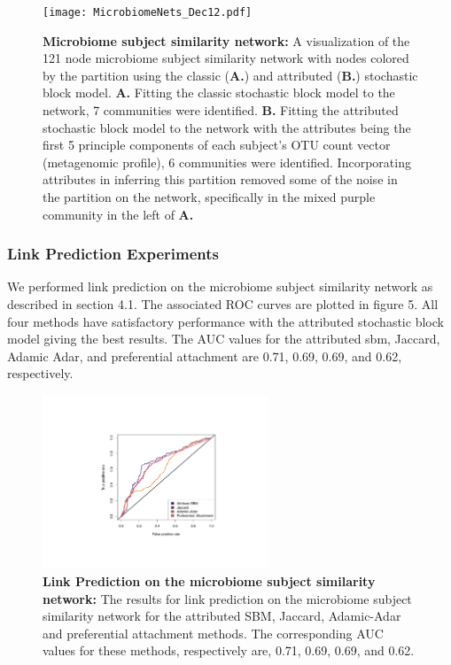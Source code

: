 \begin{figure}[h!]
\begin{center}
\texttt{[image: MicrobiomeNets\_Dec12.pdf]}
\caption{{\bf Microbiome subject similarity network:} A visualization of the 121 node microbiome subject similarity network with nodes colored by the partition using the classic ({\bf A.}) and attributed ({\bf B.}) stochastic block model. {\bf A.} Fitting the classic stochastic block model to the network, 7 communities were identified. {\bf B.} Fitting the attributed stochastic block model to the network with the attributes being the first 5 principle components of each subject's OTU count vector (metagenomic profile), 6 communities were identified. Incorporating attributes in inferring this partition removed some of the noise in the partition on the network, specifically in the mixed purple community in the left of {\bf A.}}
\end{center}
\end{figure}

\subsubsection{Link Prediction Experiments}
We performed link prediction on the microbiome subject similarity network as described in section 4.1. The associated ROC curves are plotted in figure 5. All four methods have satisfactory performance with the attributed stochastic block model giving the best results. The AUC values for the attributed sbm, Jaccard, Adamic Adar, and preferential attachment are 0.71, 0.69, 0.69, and 0.62, respectively. 
 
\begin{figure}
\begin{center}
\includegraphics[width=0.6\textwidth]{ROC_Microbiome.pdf}
\caption{{\bf Link Prediction on the microbiome subject similarity network:} The results for link prediction on the microbiome subject similarity network for the attributed SBM, Jaccard, Adamic-Adar and preferential attachment methods. The corresponding AUC values for these methods, respectively are, 0.71, 0.69, 0.69, and 0.62.}
\end{center}
\end{figure}

